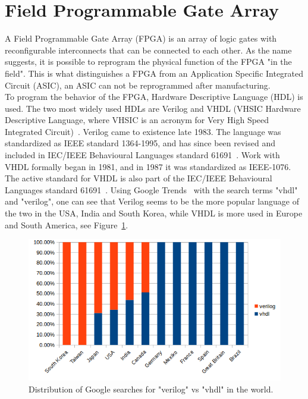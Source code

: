\section{Field Programmable Gate Array}
A Field Programmable Gate Array (FPGA) is an array of logic gates with reconfigurable interconnects that can be connected to each other. As the name suggests, it is possible to reprogram the physical function of the FPGA "in the field". This is what distinguishes a FPGA from an Application Specific Integrated Circuit (ASIC), an ASIC can not be reprogrammed after manufacturing.\\ %

To program the behavior of the FPGA, Hardware Descriptive Language (HDL) is used. The two most widely used HDLs are Verilog and VHDL (VHSIC Hardware Descriptive Language, where VHSIC is an acronym for Very High Speed Integrated Circuit)~\cite{DO178C}. Verilog came to existence late 1983. The language was standardized as IEEE standard 1364-1995, and has since been revised and included in IEC/IEEE Behavioural Languages standard 61691~\cite{IEEEVerilog}. Work with VHDL formally began in 1981, and in 1987 it was standardized as IEEE-1076. The active standard for VHDL is also part of the IEC/IEEE Behavioural Languages standard 61691~\cite{IEEEVHDL}. Using Google Trends~\cite{googletrends} with the search terms "vhdl" and "verilog", one can see that Verilog seems to be the more popular language of the two in the USA, India and South Korea, while VHDL is more used in Europe and South America, see Figure~\ref{fig:vhdlverilog}.

\begin{figure}[H]
\centering
\includegraphics[width=\textwidth]{./img/vhdlverilog.png}
\caption{Distribution of Google searches for "verilog" vs "vhdl" in the world.}\label{fig:vhdlverilog}
\end{figure}

